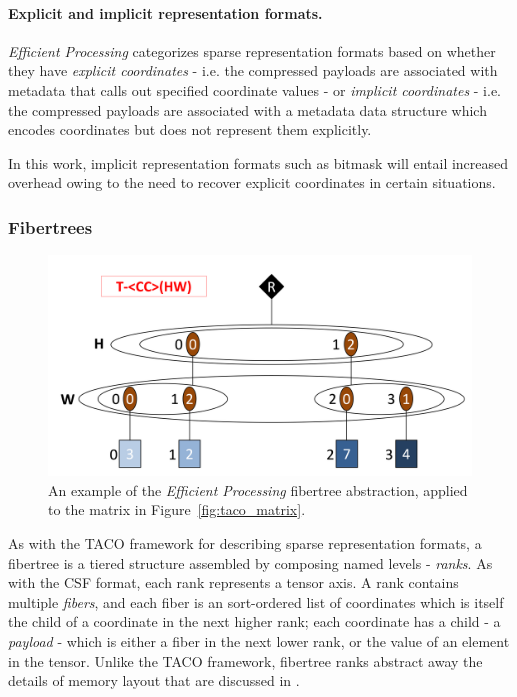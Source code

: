\paragraph{Explicit and implicit representation formats.} \textit{Efficient Processing} categorizes sparse representation formats based on whether they have \textit{explicit coordinates} - i.e. the compressed payloads are associated with metadata that calls out specified coordinate values - or \textit{implicit coordinates} - i.e. the compressed payloads are associated with a metadata data structure which encodes coordinates but does not represent them explicitly.

In this work, implicit representation formats such as bitmask will entail increased overhead owing to the need to recover explicit coordinates in certain situations.

\subsubsection{Fibertrees}
\label{sec:fibertrees}

\begin{figure}[H]
\includegraphics[width=\textwidth]{figures/efficient_processing_fibertree.png}
\caption{An example of the \textit{Efficient Processing} fibertree abstraction, applied to the matrix in Figure~\ref{fig:taco_matrix}.}
\label{fig:efficient_processing_fibertree}
\end{figure}

As with the TACO framework for describing sparse representation formats, a fibertree is a tiered structure assembled by composing named levels - \textit{ranks}. As with the CSF format\cite{csf}, each rank represents a tensor axis. A rank contains multiple \textit{fibers}, and each fiber is an sort-ordered list of coordinates which is itself the child of a coordinate in the next higher rank; each coordinate has a child - a \textit{payload} - which is either a fiber in the next lower rank, or the value of an element in the tensor. Unlike the TACO framework, fibertree ranks abstract away the details of memory layout that are discussed in \cite{taco_format}.

